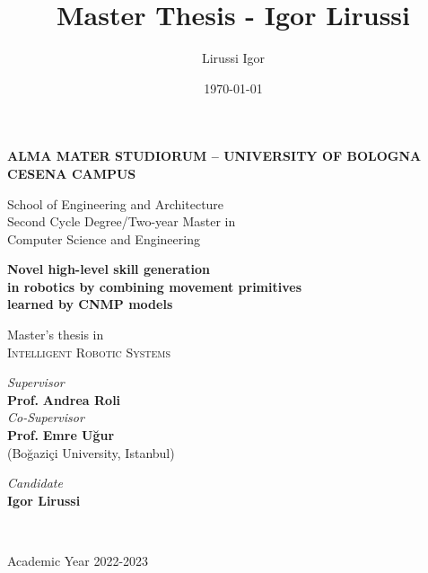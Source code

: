 \title{Master Thesis - Igor Lirussi}
\author{Lirussi Igor}
\date{\today}

\begin{titlepage}
	\begin{center}
		
		\large
		\textbf{ALMA MATER STUDIORUM -- UNIVERSITY OF BOLOGNA \\ CESENA CAMPUS }
		\\
		\noindent\hrulefill
		\vspace{0.4cm}
		
		\Large
		School of Engineering and Architecture \\
		Second Cycle Degree/Two-year Master in \\Computer Science and Engineering
		
		\Huge
		\vspace{4cm}
		\textbf{
			Novel high-level skill generation 
			\\
			in robotics by combining movement primitives
			\\
			learned by CNMP models
		}
		
		\large
		\vspace{1cm}
		Master's thesis in 
		\\
		\textsc{Intelligent Robotic Systems}
		
		\vspace{5.5cm}
		\begin{minipage}[t]{0.64\textwidth}
			\begin{flushleft}
				\textit{Supervisor} 
				\\ 
				\textbf{Prof.} \textbf{Andrea Roli}
				\\
				\vspace{0.4cm}
				\textit{Co-Supervisor} 
				\\
				\textbf{Prof.} \textbf{Emre Uğur} \\(Boğaziçi University, Istanbul)
			\end{flushleft}
		\end{minipage}
		\begin{minipage}[t]{0.34\textwidth}
			\begin{flushright}
				\textit{Candidate} 
				\\ 
				\textbf{Igor Lirussi}
			\end{flushright}
		\end{minipage}\\
		
		\vfill
		\noindent\hrulefill
		\vspace{0.3cm}
		\Large
		

		Academic Year 2022-2023
	\end{center}
\end{titlepage}
\restoregeometry
